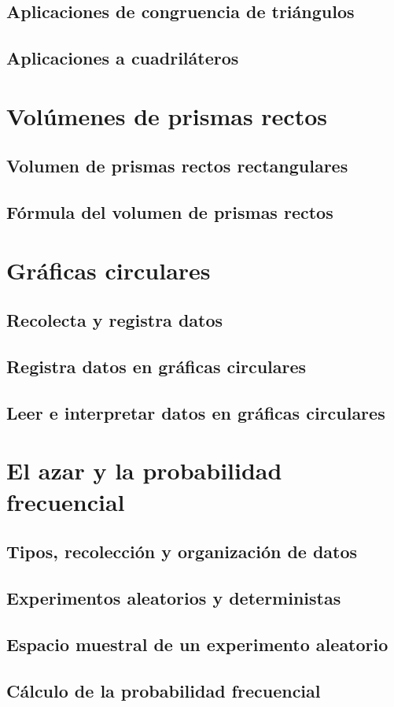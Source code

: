 \documentclass[11pt]{book}
\begin{document}
\subsection{Aplicaciones de congruencia de triángulos}

\subsection{Aplicaciones a cuadriláteros}

\newpage \thispagestyle{plain}

\section{Vol\'umenes de prismas rectos}

\subsection{Volumen de prismas rectos rectangulares}

\subsection{Fórmula del volumen de prismas rectos}


\newpage \thispagestyle{plain}

\section{Gráficas circulares}

\subsection{Recolecta y registra datos}

\subsection{Registra datos en gráficas circulares}

\subsection{Leer e interpretar datos en gráficas circulares}

\newpage \thispagestyle{plain}

\section{El azar y la probabilidad frecuencial}

\subsection{Tipos, recolección y organización de datos}

\subsection{Experimentos aleatorios y deterministas}

\subsection{Espacio muestral de un experimento aleatorio}

\subsection{Cálculo de la probabilidad frecuencial}
\end{document}
